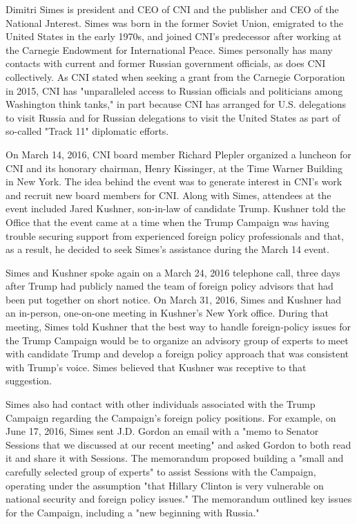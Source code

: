 Dimitri Simes is president and CEO of CNI and the publisher and CEO of the National Jnterest.%
Simes was born in the former Soviet Union, emigrated to the United States in the early 1970s, and joined CNI's predecessor after working at the Carnegie Endowment for International Peace.%
Simes personally has many contacts with current and former Russian government officials,%
as does CNI collectively.
As CNI stated when seeking a grant from the Carnegie Corporation in 2015, CNI has "unparalleled access to Russian officials and politicians among Washington think tanks,"%
in part because CNI has arranged for U.S. delegations to visit Russia and for Russian delegations to visit the United States as part of so-called "Track 11" diplomatic efforts.%

On March 14, 2016, CNI board member Richard Plepler organized a luncheon for CNI and its honorary chairman, Henry Kissinger, at the Time Warner Building in New York.%
The idea behind the event was to generate interest in CNI's work and recruit new board members for CNI.%
Along with Simes, attendees at the event included Jared Kushner, son-in-law of candidate Trump.%
Kushner told the Office that the event came at a time when the Trump Campaign was having trouble securing support from experienced foreign policy professionals and that, as a result, he decided to seek Simes's assistance during the March 14 event.%

Simes and Kushner spoke again on a March 24, 2016 telephone call,%
three days after Trump had publicly named the team of foreign policy advisors that had been put together on short notice.%
On March 31, 2016, Simes and Kushner had an in-person, one-on-one meeting in Kushner's New York office.%
During that meeting, Simes told Kushner that the best way to handle foreign-policy issues for the Trump Campaign would be to organize an advisory group of experts to meet with candidate Trump and develop a foreign policy approach that was consistent with Trump's voice.%
Simes believed that Kushner was receptive to that suggestion.%

Simes also had contact with other individuals associated with the Trump Campaign regarding the Campaign's foreign policy positions.
For example, on June 17, 2016, Simes sent J.D. Gordon an email with a "memo to Senator Sessions that we discussed at our recent meeting" and asked Gordon to both read it and share it with Sessions.
The memorandum proposed building a "small and carefully selected group of experts" to assist Sessions with the Campaign, operating under the assumption "that Hillary Clinton is very vulnerable on national security and foreign policy issues."
The memorandum outlined key issues for the Campaign, including a "new beginning with Russia."%

